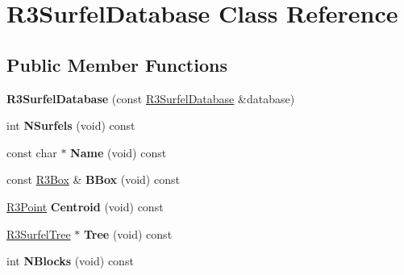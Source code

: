 \hypertarget{class_r3_surfel_database}{}\section{R3\+Surfel\+Database Class Reference}
\label{class_r3_surfel_database}
\subsection*{Public Member Functions}
\begin{DoxyCompactItemize}
\item 
{\bfseries R3\+Surfel\+Database} (const \hyperlink{class_r3_surfel_database}{R3\+Surfel\+Database} \&database)\hypertarget{class_r3_surfel_database_af3a502b6dbe607b68c32720d3e05586c}{}\label{class_r3_surfel_database_af3a502b6dbe607b68c32720d3e05586c}

\item 
int {\bfseries N\+Surfels} (void) const \hypertarget{class_r3_surfel_database_afcee4c881ee31385563f451e42a63d69}{}\label{class_r3_surfel_database_afcee4c881ee31385563f451e42a63d69}

\item 
const char $\ast$ {\bfseries Name} (void) const \hypertarget{class_r3_surfel_database_a170144e6a8df8643e0f8ca4daebe65ed}{}\label{class_r3_surfel_database_a170144e6a8df8643e0f8ca4daebe65ed}

\item 
const \hyperlink{class_r3_box}{R3\+Box} \& {\bfseries B\+Box} (void) const \hypertarget{class_r3_surfel_database_ad8540f6fdf7b224c6dae5ce492361394}{}\label{class_r3_surfel_database_ad8540f6fdf7b224c6dae5ce492361394}

\item 
\hyperlink{class_r3_point}{R3\+Point} {\bfseries Centroid} (void) const \hypertarget{class_r3_surfel_database_a2f752122a68d6c5bd11c2593e913d8f0}{}\label{class_r3_surfel_database_a2f752122a68d6c5bd11c2593e913d8f0}

\item 
\hyperlink{class_r3_surfel_tree}{R3\+Surfel\+Tree} $\ast$ {\bfseries Tree} (void) const \hypertarget{class_r3_surfel_database_ab4ed15cd77c435284554c19cc18e0a71}{}\label{class_r3_surfel_database_ab4ed15cd77c435284554c19cc18e0a71}

\item 
int {\bfseries N\+Blocks} (void) const \hypertarget{class_r3_surfel_database_af8e49fc3f6df3fe1f2c2dfd807da9708}{}\label{class_r3_surfel_database_af8e49fc3f6df3fe1f2c2dfd807da9708}


\end{DoxyCompactItemize}
